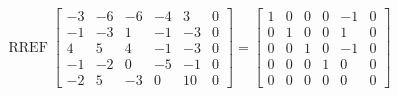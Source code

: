 \begin{exerciseAnswer} 


\[\operatorname{RREF} \left[\begin{array}{ccccc|c}
-3 & -6 & -6 & -4 & 3 & 0 \\
-1 & -3 & 1 & -1 & -3 & 0 \\
4 & 5 & 4 & -1 & -3 & 0 \\
-1 & -2 & 0 & -5 & -1 & 0 \\
-2 & 5 & -3 & 0 & 10 & 0
\end{array}\right] = \left[\begin{array}{ccccc|c}
1 & 0 & 0 & 0 & -1 & 0 \\
0 & 1 & 0 & 0 & 1 & 0 \\
0 & 0 & 1 & 0 & -1 & 0 \\
0 & 0 & 0 & 1 & 0 & 0 \\
0 & 0 & 0 & 0 & 0 & 0
\end{array}\right] \]



\end{exerciseAnswer}
